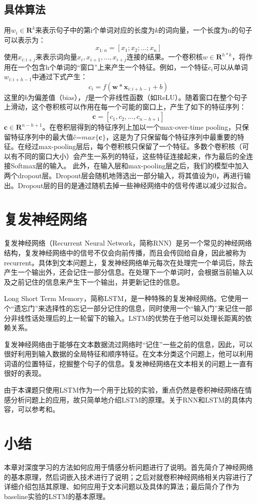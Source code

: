 \subsection{具体算法}
用$w_i\in \mathbf{R}^k$来表示句子中的第i个单词对应的长度为$k$的词向量，一个长度为n的句子可以表示为：
\begin{equation} \label{eq3.1}
x_{1:n} = [x_1; x_2;...; x_n]
\end{equation}
使用$x_{i:i+j}$来表示词向量$x_i, x_{i+1}, …, x_{i+j}$连接的结果。一个卷积核$w\in \mathbf{R}^{h*k}$，将作用在一个包含h个单词的“窗口”上来产生一个特征。例如，一个特征$c_i$可以从单词$w_{i:i+h-1}$中通过下式产生：
\begin{equation} \label{eq3.2}
c_i = f(\textbf{w}*\textbf{x}_{i:i+h-1} + b)
\end{equation}	
这里的$b$为偏差值（bias），$f$是一个非线性函数（如ReLU）。随着窗口在整个句子上滑动，这个卷积核可以作用在每一个可能的窗口上，产生了如下的特征序列：
\begin{equation} \label{eq3.3}
\textbf{c} = [c_1, c_2, ..., c_{n-h+1}]
\end{equation}	
$\textbf{c}\in\mathbf{R}^{n-h+1}$。在卷积层得到的特征序列上加以一个max-over-time pooling，只保留特征序列中的最大值\^{c}=$max\{\textbf{c}\}$，这是为了只保留每个特征序列中最重要的特征。在经过max-pooling层后，每个卷积核只保留了一个特征。多数个卷积核（可以有不同的窗口大小）会产生一系列的特征，这些特征连接起来，作为最后的全连接Softmax层的输入。
此外，在输入层和max-pooling层之后，我们的模型中加入两个dropout层。Dropout层会随机地筛选出一部分输入，将其值设为0，再进行输出。Dropout层的目的是通过随机去掉一些神经网络中的信号传递以减少过拟合。

\section{复发神经网络}
复发神经网络（Recurrent Neural Network，简称RNN）是另一个常见的神经网络结构，复发神经网络中的信号不仅会向前传播，而且会传回给自身，因此被称为recurrent。具体到文本问题上，复发神经网络单元每次在处理完一个单词后，除去产生一个输出外，还会记住一部分信息。在处理下一个单词时，会根据当前输入以及之前记住的信息来产生下一个输出，并更新记住的信息。

Long Short Term Memory，简称LSTM，是一种特殊的复发神经网络。它使用一个“遗忘门”来选择性的忘记一部分记住的信息，同时使用一个“输入门”来记住一部分非线性话处理后的上一轮留下的输入。LSTM的优势在于他可以处理长距离的依赖关系。

复发神经网络由于能够在文本数据流过网络时“记住”一些之前的信息，因此，可以很好利用到输入数据的全局特征和顺序特征。在文本分类这个问题上，他可以利用词语的位置特征，挖掘整个句子的信息。复发神经网络在文本相关的问题上一直有很好的表现。

由于本课题只使用LSTM作为一个用于比较的实验，重点仍然是卷积神经网络在情感分析问题上的应用，故只简单地介绍LSTM的原理。关于RNN和LSTM的具体内容，可以参考\cite{socher.2013.recursive}和\cite{sundermeyer2012lstm}。

\section{小结}
本章对深度学习的方法如何应用于情感分析问题进行了说明。首先简介了神经网络的基本原理，然后词嵌入技术进行了说明；之后对就卷积神经网络相关内容进行了详细介绍包括其原理、如何应用于文本问题以及具体的算法；最后简介了作为baseline实验的LSTM的基本原理。

